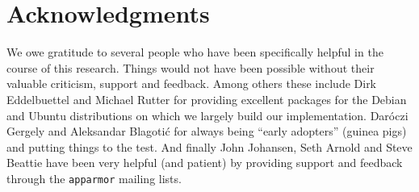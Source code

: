 \documentclass{jss}
\begin{document}
\section{Acknowledgments}

We owe gratitude to several people who have been specifically helpful in the
course of this research. Things would not have been possible without their 
valuable criticism, support and feedback. Among others these include Dirk
Eddelbuettel and Michael Rutter for providing excellent packages for the Debian
and Ubuntu distributions on which we largely build our implementation. Daróczi
Gergely and Aleksandar Blagotić for always being ``early adopters'' (guinea
pigs) and putting things to the test. And finally John Johansen, Seth Arnold and
Steve Beattie have been very helpful (and patient) by providing support and
feedback through the \texttt{apparmor} mailing lists.
\end{document}
